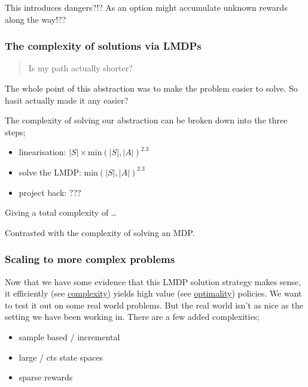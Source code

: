 This introduces dangers?!? As an option might accumulate unknown rewards
along the way!??

\hypertarget{the-complexity-of-solutions-via-lmdps}{%
\subsubsection{The complexity of solutions via
LMDPs}\label{the-complexity-of-solutions-via-lmdps}}

\begin{quote}
Is my path actually shorter?
\end{quote}

The whole point of this abstraction was to make the problem easier to
solve. So hasit actually made it any easier?

The complexity of solving our abstraction can be broken down into the
three steps;

\begin{itemize}
\tightlist
\item
  linearisation: \(|S| \times \text{min}(|S|,|A|)^{2.3}\)
\item
  solve the LMDP: \(\text{min}(|S|,|A|)^{2.3}\)
\item
  project back: \(???\)
\end{itemize}

Giving a total complexity of \ldots{}

Contrasted with the complexity of solving an MDP.

\hypertarget{scaling-to-more-complex-problems}{%
\subsubsection{Scaling to more complex
problems}\label{scaling-to-more-complex-problems}}

Now that we have some evidence that this LMDP solution strategy makes
sense, it efficiently (see \href{}{complexity}) yields high value (see
\href{}{optimality}) policies. We want to test it out on some real world
problems. But the real world isn't as nice as the setting we have been
working in. There are a few added complexities;

\begin{itemize}
\tightlist
\item
  sample based / incremental
\item
  large / cts state spaces
\item
  sparse rewards
\end{itemize}

